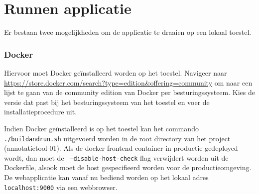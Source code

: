 \section{Runnen applicatie}
\label{sec:run_app}
Er bestaan twee mogelijkheden om de applicatie te draaien op een lokaal toestel. 
\subsubsection{Docker}
Hiervoor moet Docker ge\"installeerd worden op het toestel. Navigeer naar \url{https://store.docker.com/search?type=edition&offering=community} om naar een lijst te gaan van de community edition van Docker per besturingssysteem. Kies de versie dat past bij het besturingssysteem van het toestel en voer de installatieprocedure uit.

Indien Docker ge\"installeerd is op het toestel kan het commando \texttt{./buildandrun.sh} uitgevoerd worden in de root directory van het project (annotatietool-01).
Als de docker frontend container in productie gedeployed wordt, dan moet de \texttt{ --disable-host-check} flag verwijdert worden uit de Dockerfile, alsook moet de host gespecifieerd worden voor de productieomgeving.
De webapplicatie kan vanaf nu bediend worden op het lokaal adres \texttt{localhost:9000} via een webbrowser.

